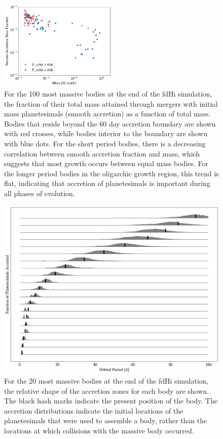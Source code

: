 \documentclass[twocolumn]{aastex63}
\begin{document}
\begin{figure}
\begin{center}
    \includegraphics[width=0.5\textwidth]{figures/minor_frac.png}
    \caption{For the 100 most massive bodies at the end of the fdHi simulation, the fraction of their total mass attained through mergers with initial mass planetesimals (smooth accretion) as a function of total mass. Bodies that reside beyond the 60 day accretion boundary are shown with red crosses, while bodies interior to the boundary are shown with blue dots. For the short period bodies, there is a decreasing correlation between smooth accretion fraction and mass, which suggests that most growth occurs between equal mass bodies. For the longer period bodies in the oligarchic growth region, this trend is flat, indicating that accretion of planetesimals is important during all phases of evolution.\label{fig:minor_frac}}
\end{center}
\end{figure}

\begin{figure}
\begin{center}
    \includegraphics[width=\textwidth]{figures/acc_zones.png}
    \caption{For the 20 most massive bodies at the end of the fdHi simulation, the relative shape of the accretion zones for each body are shown. The black hash marks indicate the present position of the body. The accretion distributions indicate the initial locations of the planetesimals that were used to assemble a body, rather than the locations at which collisions with the massive body occurred.\label{fig:acc_zones}}
\end{center}
\end{figure}
\end{document}
